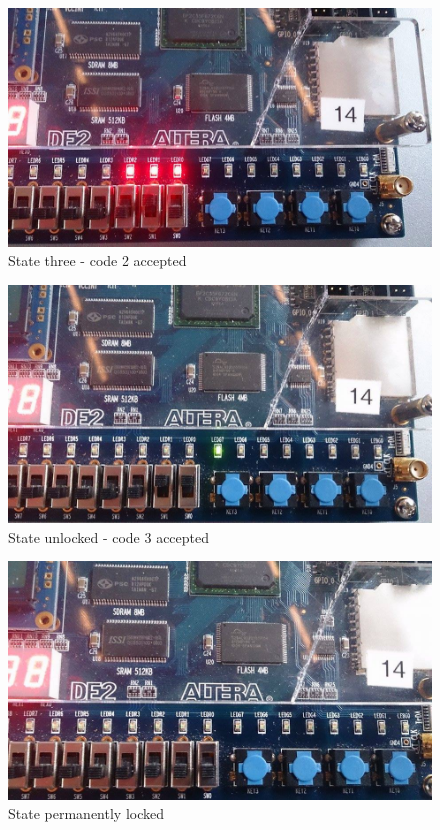 \begin{enumerate}
\begin{figure}[h]
	\centering
	\includegraphics[scale=0.45]{pictures/Oevelse7/opg2/StateThree.JPG}
	\caption{State three - code 2 accepted}
	\label{fig:}
\end{figure}

\begin{figure}[h]
	\centering
	\includegraphics[scale=0.45]{pictures/Oevelse7/opg2/StateUnlocked.JPG}
	\caption{State unlocked - code 3 accepted}
	\label{fig:}
\end{figure}

\begin{figure}[h]
	\centering
	\includegraphics[scale=0.45]{pictures/Oevelse7/opg2/StatePermLocked.JPG}
	\caption{State permanently locked}
	\label{fig:}
\end{figure}

\end{enumerate}
	